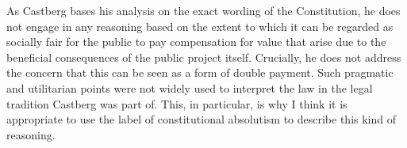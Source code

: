 
As Castberg bases his analysis on the exact wording of the Constitution, he does not engage in any reasoning based on the extent to which it can be regarded as socially fair for the public to pay compensation for value that arise due to the beneficial consequences of the public project itself. Crucially, he does not address the concern that this can be seen as a form of double payment. Such pragmatic and utilitarian points were not widely used to interpret the law in the legal tradition Castberg was part of. This, in particular, is why I think it is appropriate to use the label of constitutional absolutism to describe this kind of reasoning.

